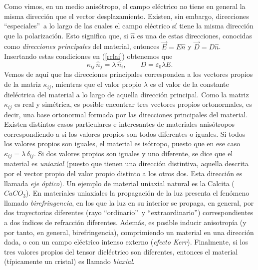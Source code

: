 Como vimos, en un medio anisótropo, el campo eléctrico no tiene en general
la misma dirección que el vector desplazamiento.
Existen, sin embargo, direcciones ``especiales''\, a lo largo de las cuales el
campo eléctrico sí tiene la misma dirección que la polarización. Esto significa
que, si $\hat{n}$ es una de estas direcciones, conocidas como \textit{direcciones
principales} del material, entonces $\vec{E}=E\hat{n}$ y $\vec{D}=D\hat{n}$.
Insertando estas condiciones en (\ref{rclai}) obtenemos que
\begin{equation}
\kappa_{ij}\,\hat{n}_j= \lambda\,\hat{n}_i, \qquad D=\varepsilon_0\lambda E.
\end{equation}
Vemos de aquí que las direcciones principales corresponden a los vectores
propios de la matriz  $\kappa_{ij}$, mientras que el valor propio $\lambda$ es
el valor de la constante dieléctrica del material a lo largo de aquella
dirección principal. Como la matriz $\kappa_{ij}$ es real y simétrica, es
posible encontrar tres vectores propios ortonormales, es decir, una base
ortonormal formada por las direcciones principales del material. Existen
distintos casos particulares e interesantes de materiales anisótropos
correspondiendo a si los valores propios son todos diferentes o iguales. Si
todos los valores propios son iguales, el material es isótropo, puesto que en
ese caso $\kappa_{ij}=\lambda\,\delta_{ij}$. Si dos valores propios son iguales
y uno diferente, se dice que el material es \textit{uniaxial} (puesto que
tienen una dirección distintiva, aquella descrita por el vector propio del
valor propio distinto a los otros dos. Esta dirección es llamada \textit{eje
óptico}). Un ejemplo de material uniaxial natural es la Calcita ($CaCO_3$). En
materiales uniaxiales la propagación de la luz presenta el fenómeno llamado
\textit{birefringencia}, en los que la luz en su interior se propaga, en
general, por dos trayectorias diferentes (rayo ``ordinario''\, y
``extraordinario'') correspondientes a dos índices de refracción diferentes.
Además, es posible inducir anisotropía (y por tanto, en general,
birefringencia), comprimiendo un material en una dirección dada, o
con un campo eléctrico intenso externo (\textit{efecto Kerr}). Finalmente, si
los tres valores propios del tensor dieléctrico son diferentes, entonces el
material (típicamente un cristal) es llamado \textit{biaxial}.

